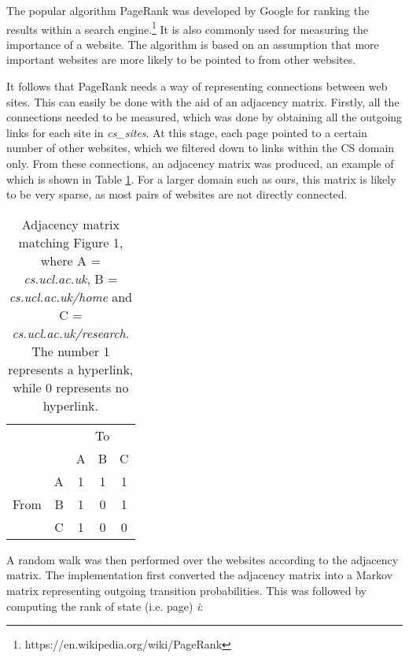 The popular algorithm PageRank was developed by Google for ranking the results within a search engine.\footnote{https://en.wikipedia.org/wiki/PageRank} It is also commonly used for measuring the importance of a website. The algorithm is based on an assumption that more important websites are more likely to be pointed to from other websites.

It follows that PageRank needs a way of representing connections between web sites. This can easily be done with the aid of an adjacency matrix. Firstly, all the connections needed to be measured, which was done by obtaining all the outgoing links for each site in \emph{cs\_sites}. At this stage, each page pointed to a certain number of other websites,
which we filtered down to links within the CS domain only. From these connections, an adjacency matrix was produced, an example of which is shown in Table \ref{fig:adj_mx}. For a larger domain such as ours, this matrix is likely to be very sparse, as most pairs of websites are not directly connected.

\begin{table}[!t]
  \centering
  \caption{Adjacency matrix matching Figure 1, where A = \emph{cs.ucl.ac.uk}, B = \emph{cs.ucl.ac.uk/home} and C = \emph{cs.ucl.ac.uk/research}. The number 1 represents a hyperlink, while 0 represents no hyperlink.}
  \begin{tabular}{|lr|c|c|c|} \cline{3-5}
  \multicolumn{1}{l}{} && \multicolumn{3}{c|}{To} \\ \cline{3-5}
  \multicolumn{1}{l}{} & & A & B & C  \\ \hline
  \multirow{3}{*}{\begin{sideways}From\end{sideways}}
  & \multicolumn{1}{|r|}{A} & 1 & 1 & 1  \\ \cline{2-5}
  & \multicolumn{1}{|r|}{B} & 1 & 0 & 1  \\ \cline{2-5}
  & \multicolumn{1}{|r|}{C} & 1 & 0 & 0  \\ \hline
  \end{tabular}
  \label{fig:adj_mx}
\end{table}

A random walk was then performed over the websites according to the adjacency matrix. The implementation first converted the adjacency matrix into a Markov matrix representing outgoing transition probabilities. This was followed by computing the rank of state (i.e. page) \emph{i}:

